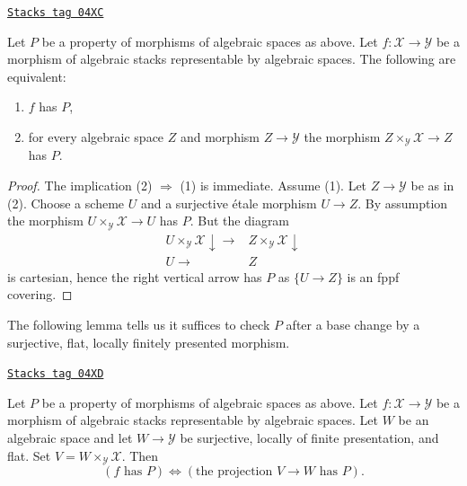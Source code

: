 \begin{lemma}
\label{stacks-properties-lemma-property-spaces-too}
\href{https://stacks.math.columbia.edu/tag/04XC}{\texttt{Stacks tag 04XC}}

Let $P$ be a property of morphisms of algebraic spaces as above.
Let $f : \mathcal{X} \to \mathcal{Y}$ be a morphism of algebraic stacks
representable by algebraic spaces. The following are equivalent:
\begin{enumerate}
\item $f$ has $P$,
\item for every algebraic space $Z$ and morphism $Z \to \mathcal{Y}$
the morphism $Z \times_\mathcal{Y} \mathcal{X} \to Z$ has $P$.
\end{enumerate}
\end{lemma}

\begin{proof}
The implication (2) $\Rightarrow$ (1) is immediate. Assume (1).
Let $Z \to \mathcal{Y}$ be as in (2). Choose a scheme $U$ and a
surjective \'etale morphism $U \to Z$. By assumption the morphism
$U \times_\mathcal{Y} \mathcal{X} \to U$ has $P$. But the diagram
$$
\begin{array}{cc}U \times_\mathcal{Y} \mathcal{X} \downarrow\longrightarrow & Z \times_\mathcal{Y} \mathcal{X} \downarrow \\ U \longrightarrow & Z\end{array}
$$
is cartesian, hence the right vertical arrow has $P$ as
$\{U \to Z\}$ is an fppf covering.
\end{proof}

The following lemma tells us it suffices to check $P$
after a base change by a surjective, flat, locally finitely presented
morphism.

\begin{lemma}
\label{stacks-properties-lemma-check-property-covering}
\href{https://stacks.math.columbia.edu/tag/04XD}{\texttt{Stacks tag 04XD}}

Let $P$ be a property of morphisms of algebraic spaces as above.
Let $f : \mathcal{X} \to \mathcal{Y}$ be a morphism of algebraic stacks
representable by algebraic spaces.
Let $W$ be an algebraic space and let $W \to \mathcal{Y}$ be surjective,
locally of finite presentation, and flat.
Set $V = W \times_\mathcal{Y} \mathcal{X}$. Then
$$
(f\text{ has }P) \Leftrightarrow (\text{the projection }V \to W\text{ has }P).
$$
\end{lemma}


